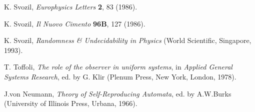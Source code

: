 \documentclass[pra,amsfonts, twocolumn]{revtex4}
\begin{document}
\begin{thebibliography}{99}
K. Svozil,
{\sl Europhysics Letters} {\bf 2}, 83 (1986).


K. Svozil,
 {\sl Il Nuovo Cimento} {\bf 96B}, 127 (1986).


K. Svozil,
{\sl Randomness \& Undecidability in Physics}
(World Scientific, Singapore, 1993).


 T. Toffoli,
{\sl The role of the observer in uniform systems}, in {\sl Applied
General Systems Research}, ed. by G. Klir (Plenum Press, New York,
London, 1978).

%
%
%
 J.von Neumann,
 {\sl Theory of Self-Reproducing Automata}, ed. by A.W.Burks
 (University of Illinois Press, Urbana, 1966).

%
%
\end{thebibliography}
\end{document}
